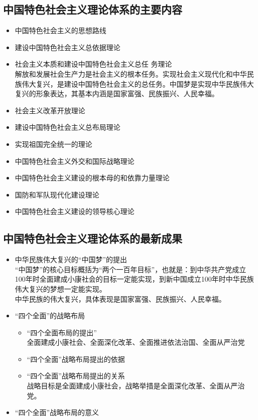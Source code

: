 \subsection{中国特色社会主义理论体系的主要内容}
\begin{itemize}
	\item 中国特色社会主义的思想路线
	\item 建设中国特色社会主义总依据理论
	\item 社会主义本质和建设中国特色社会主义总任
	务理论\\
	解放和发展社会生产力是社会主义的根本任务。实现社会主义现代化和中华民族伟大复兴，是建设中国特色社会主义的总任务。中国梦是实现中华民族伟大复兴的形象表达，其基本内涵是国家富强、民族振兴、人民幸福。
	\item 社会主义改革开放理论
	\item 建设中国特色社会主义总布局理论
	\item 实现祖国完全统一的理论
	\item 中国特色社会主义外交和国际战略理论
	\item 中国特色社会主义建设的根本母的和依靠力量理论
	\item 国防和军队现代化建设理论
	\item 中国特色社会主义建设的领导核心理论
	
 \end{itemize}
\subsection{中国特色社会主义理论体系的最新成果}
\begin{itemize}
	\item 中华民族伟大复兴的“中国梦”的提出\\
	\text{\qquad}“中国梦”的核心目标概括为“两个一百年目标”，也就是：到中华共产党成立100年时全面建成小康社会的目标一定能实现，到新中国成立100年时中华民族伟大复兴的梦想一定能实现。\\
	\text{\qquad}中华民族的伟大复兴，具体表现是国家富强、民族振兴、人民幸福。
	\item “四个全面”的战略布局
	\begin{itemize}
	\item “四个全面布局的提出”\\
	全面建成小康社会、全面深化改革、全面推进依法治国、全面从严治党
	\item “四个全面”战略布局提出的依据
	\item “四个全面”战略布局提出的关系\\
	战略目标是全面建成小康社会，战略举措是全面深化改革、全面从严治党。
	\end{itemize}
	\item “四个全面”战略布局的意义
\end{itemize}
